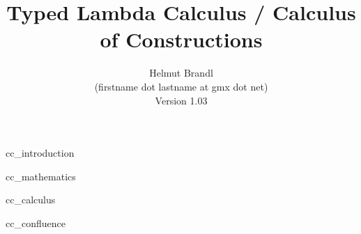 \documentclass[12pt]{article}
\begin{document}


\title{
    Typed Lambda Calculus / Calculus of Constructions
}

\author{
    Helmut Brandl
    \\
    \scriptsize (firstname dot lastname at gmx dot net)
    \\
    \scriptsize Version 1.03
}
\date{}

\maketitle




\tableofcontents

 {cc_introduction}

 {cc_mathematics}

 {cc_calculus}

 {cc_confluence}






\end{document}
